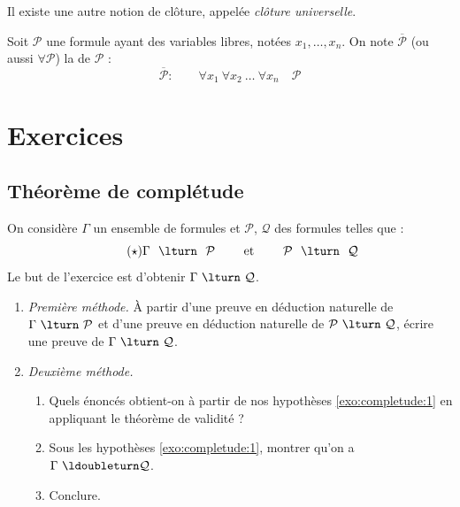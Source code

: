 \documentclass[11pt,class=report,crop=false]{standalone}
\begin{document}

Il existe une autre notion de clôture, appelée \emph{clôture universelle}.

\begin{definition}
	Soit $\mathcal{P}$ une formule ayant des variables libres, notées $x_1, \ldots, x_n$. On note $\overline{\mathcal{P}}$ (ou aussi $\forall \mathcal{P}$) la  de $\mathcal{P}$ :
	\[
	\overline{\mathcal{P}} : \qquad 
	\forall x_1 \ \forall x_2 \ \ldots \ \forall x_n \quad \mathcal{P}
	\] 
\end{definition}




\section*{Exercices}

\subsection*{Théorème de complétude}

\begin{exercicecours}
On considère $\Gamma$ un ensemble de formules et $\mathcal{P}$, $\mathcal{Q}$ des formules telles que :
\begin{equation}
	\label{exo:completude:1}
	\tag{$\star$}
\Gamma \ \  \lturn \ \  \mathcal{P} 
\qquad \text{ et } \qquad
\mathcal{P} \ \ \lturn \ \ \mathcal{Q} 
\end{equation}
Le but de l'exercice est d'obtenir $\Gamma \ \lturn \ \mathcal{Q}$.

\begin{enumerate}
	\item \emph{Première méthode.}
	À partir d'une preuve en déduction naturelle de $\Gamma \ \lturn \ \mathcal{P}$ et d'une preuve  en déduction naturelle de $\mathcal{P} \ \lturn \ \mathcal{Q}$, écrire une preuve de $\Gamma \ \lturn \ \mathcal{Q}$. 
	
	\item\emph{Deuxième méthode.}
	\begin{enumerate}
		\item Quels énoncés obtient-on à partir de nos hypothèses \eqref{exo:completude:1} en appliquant le théorème de validité ?
		
		\item Sous les hypothèses \eqref{exo:completude:1}, montrer qu'on a $\Gamma \ \ldoubleturn \mathcal{Q}$.
		
		\item Conclure.
	\end{enumerate}	
\end{enumerate}	
\end{exercicecours}
\end{document}
